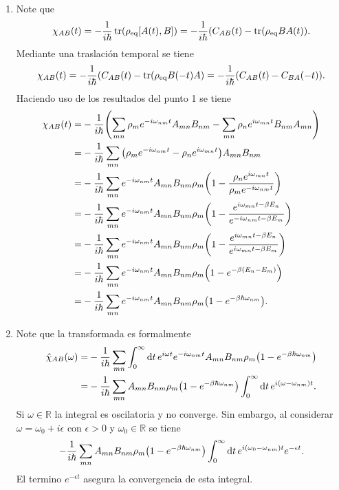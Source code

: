 \documentclass{article}
\begin{document}
\begin{enumerate}
\item Note que
\begin{equation}
\chi_{AB}(t)=-\frac{1}{i\hbar}\tr(\rho_\text{eq}[A(t),B])=-\frac{1}{i\hbar}(C_{AB}(t)-\tr(\rho_\text{eq}BA(t)).
\end{equation}
Mediante una traslación temporal se tiene
\begin{equation}
\chi_{AB}(t)=-\frac{1}{i\hbar}(C_{AB}(t)-\tr(\rho_\text{eq}B(-t)A)=-\frac{1}{i\hbar}(C_{AB}(t)-C_{BA}(-t)).
\end{equation}
Haciendo uso de los resultados del punto 1 se tiene
\begin{align}
\begin{split}
\chi_{AB}(t)=&-\frac{1}{i\hbar}\qty(\sum_{mn}\rho_me^{-i\omega_{nm}t}A_{mn}B_{nm}-\sum_{mn}\rho_ne^{i\omega_{mn}t}B_{nm}A_{mn})\\
=&-\frac{1}{i\hbar}\sum_{mn}\qty(\rho_me^{-i\omega_{nm}t}-\rho_ne^{i\omega_{mn}t})A_{mn}B_{nm}\\
=&-\frac{1}{i\hbar}\sum_{mn}e^{-i\omega_{nm}t}A_{mn}B_{nm}\rho_m\qty(1-\frac{\rho_ne^{i\omega_{mn}t}}{\rho_me^{-i\omega_{nm}t}})\\
=&-\frac{1}{i\hbar}\sum_{mn}e^{-i\omega_{nm}t}A_{mn}B_{nm}\rho_m\qty(1-\frac{e^{i\omega_{mn}t-\beta E_n}}{e^{-i\omega_{nm}t-\beta E_m}})\\
=&-\frac{1}{i\hbar}\sum_{mn}e^{-i\omega_{nm}t}A_{mn}B_{nm}\rho_m\qty(1-\frac{e^{i\omega_{mn}t-\beta E_n}}{e^{i\omega_{mn}t-\beta E_m}})\\
=&-\frac{1}{i\hbar}\sum_{mn}e^{-i\omega_{nm}t}A_{mn}B_{nm}\rho_m\qty(1-e^{-\beta (E_n-E_m)})\\
=&-\frac{1}{i\hbar}\sum_{mn}e^{-i\omega_{nm}t}A_{mn}B_{nm}\rho_m\qty(1-e^{-\beta\hbar\omega_{nm}}).
\end{split}
\end{align}

\item Note que la transformada es formalmente
\begin{align}
\begin{split}
\hat{\chi}_{AB}(\omega)=&-\frac{1}{i\hbar}\sum_{mn}\int_0^\infty\dd{t}e^{i\omega t}e^{-i\omega_{nm}t}A_{mn}B_{nm}\rho_m\qty(1-e^{-\beta\hbar\omega_{nm}})\\
=&-\frac{1}{i\hbar}\sum_{mn}A_{mn}B_{nm}\rho_m\qty(1-e^{-\beta\hbar\omega_{nm}})\int_0^\infty\dd{t}e^{i(\omega-\omega_{nm})t}.
\end{split}
\end{align}
Si $\omega\in\mathbb{R}$ la integral es oscilatoria y no converge. Sin embargo, al considerar $\omega=\omega_0+i\epsilon$ con $\epsilon>0$ y $\omega_0\in\mathbb{R}$ se tiene
\begin{equation}
-\frac{1}{i\hbar}\sum_{mn}A_{mn}B_{nm}\rho_m\qty(1-e^{-\beta\hbar\omega_{nm}})\int_0^\infty\dd{t}e^{i(\omega_0-\omega_{nm})t}e^{-\epsilon t}.
\end{equation}
El termino $e^{-\epsilon t}$ asegura la convergencia de esta integral. 


\end{enumerate}
\end{document}

